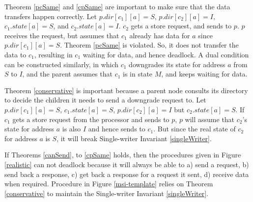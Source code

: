 Theorem \ref{pcSame} and \ref{cpSame} are important to make sure that the data
transfers happen correctly. Let $p.dir[c_1][a] = S$, $p.dir[c_2][a] = I$,
$c_1.state[a] = S$, and $c_2.state[a] = I$. $c_2$ gets a store request, and
sends  to $p$. $p$ receives the request, but assumes that
$c_1$ already has data for $a$ since $p.dir[c_1][a] = S$. Theorem \ref{pcSame}
is violated. So, it does not transfer the data to $c_1$, resulting in $c_1$
waiting for data, and hence deadlock. A dual condition can be constructed
similarly, in which $c_1$ downgrades its state for address $a$ from $S$ to $I$,
and the parent assumes that $c_1$ is in state $M$, and keeps waiting for data.

Theorem \ref{conservative} is important because a parent node consults its
directory to decide the children it needs to send a downgrade request to.  Let
$p.dir[c_1][a] = S$, $c_1.state[a] = S$, $p.dir[c_2][a] = I$ but
$c_2.state[a] = S$. If $c_1$ gets a store request from the processor and sends
 to $p$, $p$ will assume that $c_2$'s state for address $a$
is also $I$ and hence sends  to $c_1$. But since the real
state of  $c_2$ for address $a$ is $S$, it will break Single-writer Invariant
\ref{singleWriter}.

If Theorems \ref{canSend}, to \ref{cpSame} holds, then the procedures given in
Figure \ref{realistic} can not deadlock because it will always be able to a)
send a request, b) send back a response, c) get back a response for a request it
sent, d) receive data when required. Procedure \uReq{} in Figure
\ref{msi-template} relies on Theorem \ref{conservative} to maintain the
Single-writer Invariant \ref{singleWriter}.
